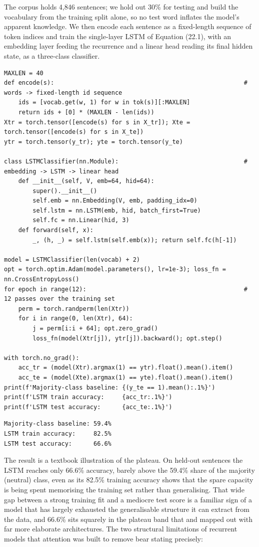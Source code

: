 The corpus holds 4,846 sentences; we hold out 30\% for testing and build the vocabulary from the training split alone, so no test word inflates the model's apparent knowledge. We then encode each sentence as a fixed-length sequence of token indices and train the single-layer LSTM of Equation (22.1), with an embedding layer feeding the recurrence and a linear head reading its final hidden state, as a three-class classifier.

\begin{verbatim}
MAXLEN = 40
def encode(s):                                                     # words -> fixed-length id sequence
    ids = [vocab.get(w, 1) for w in tok(s)][:MAXLEN]
    return ids + [0] * (MAXLEN - len(ids))
Xtr = torch.tensor([encode(s) for s in X_tr]); Xte = torch.tensor([encode(s) for s in X_te])
ytr = torch.tensor(y_tr); yte = torch.tensor(y_te)

class LSTMClassifier(nn.Module):                                   # embedding -> LSTM -> linear head
    def __init__(self, V, emb=64, hid=64):
        super().__init__()
        self.emb = nn.Embedding(V, emb, padding_idx=0)
        self.lstm = nn.LSTM(emb, hid, batch_first=True)
        self.fc = nn.Linear(hid, 3)
    def forward(self, x):
        _, (h, _) = self.lstm(self.emb(x)); return self.fc(h[-1])

model = LSTMClassifier(len(vocab) + 2)
opt = torch.optim.Adam(model.parameters(), lr=1e-3); loss_fn = nn.CrossEntropyLoss()
for epoch in range(12):                                            # 12 passes over the training set
    perm = torch.randperm(len(Xtr))
    for i in range(0, len(Xtr), 64):
        j = perm[i:i + 64]; opt.zero_grad()
        loss_fn(model(Xtr[j]), ytr[j]).backward(); opt.step()

with torch.no_grad():
    acc_tr = (model(Xtr).argmax(1) == ytr).float().mean().item()
    acc_te = (model(Xte).argmax(1) == yte).float().mean().item()
print(f'Majority-class baseline: {(y_te == 1).mean():.1%}')
print(f'LSTM train accuracy:     {acc_tr:.1%}')
print(f'LSTM test accuracy:      {acc_te:.1%}')
\end{verbatim}

\begin{verbatim}
Majority-class baseline: 59.4%
LSTM train accuracy:     82.5%
LSTM test accuracy:      66.6%
\end{verbatim}

The result is a textbook illustration of the plateau. On held-out sentences the LSTM reaches only 66.6\% accuracy, barely above the 59.4\% share of the majority (neutral) class, even as its 82.5\% training accuracy shows that the spare capacity is being spent memorising the training set rather than generalising. That wide gap between a strong training fit and a mediocre test score is a familiar sign of a model that has largely exhausted the generalisable structure it can extract from the data, and 66.6\% sits squarely in the plateau band that \cite{sohangir2018big} and \cite{correia2022dnn} mapped out with far more elaborate architectures. The two structural limitations of recurrent models that attention was built to remove bear stating precisely:

